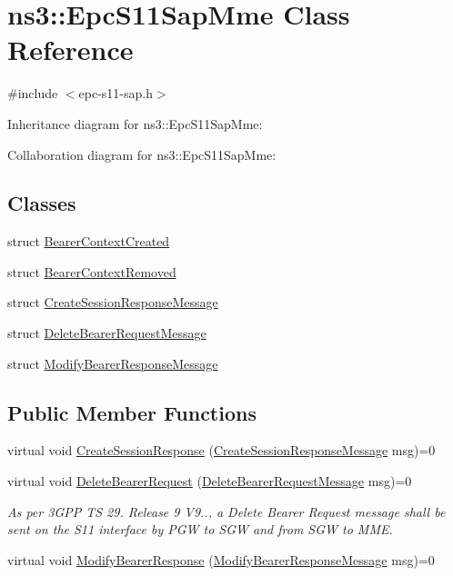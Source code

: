 \hypertarget{classns3_1_1EpcS11SapMme}{}\section{ns3\+:\+:Epc\+S11\+Sap\+Mme Class Reference}
\label{classns3_1_1EpcS11SapMme}


{\ttfamily \#include $<$epc-\/s11-\/sap.\+h$>$}



Inheritance diagram for ns3\+:\+:Epc\+S11\+Sap\+Mme\+:


Collaboration diagram for ns3\+:\+:Epc\+S11\+Sap\+Mme\+:
\subsection*{Classes}
\begin{DoxyCompactItemize}
\item 
struct \hyperlink{structns3_1_1EpcS11SapMme_1_1BearerContextCreated}{Bearer\+Context\+Created}
\item 
struct \hyperlink{structns3_1_1EpcS11SapMme_1_1BearerContextRemoved}{Bearer\+Context\+Removed}
\item 
struct \hyperlink{structns3_1_1EpcS11SapMme_1_1CreateSessionResponseMessage}{Create\+Session\+Response\+Message}
\item 
struct \hyperlink{structns3_1_1EpcS11SapMme_1_1DeleteBearerRequestMessage}{Delete\+Bearer\+Request\+Message}
\item 
struct \hyperlink{structns3_1_1EpcS11SapMme_1_1ModifyBearerResponseMessage}{Modify\+Bearer\+Response\+Message}
\end{DoxyCompactItemize}
\subsection*{Public Member Functions}
\begin{DoxyCompactItemize}
\item 
virtual void \hyperlink{classns3_1_1EpcS11SapMme_a844a9c2d1b8a5e3c5d61cb6b44d50c75}{Create\+Session\+Response} (\hyperlink{structns3_1_1EpcS11SapMme_1_1CreateSessionResponseMessage}{Create\+Session\+Response\+Message} msg)=0
\item 
virtual void \hyperlink{classns3_1_1EpcS11SapMme_a18ebb205bd46492fa9136dfc1e2ca1b2}{Delete\+Bearer\+Request} (\hyperlink{structns3_1_1EpcS11SapMme_1_1DeleteBearerRequestMessage}{Delete\+Bearer\+Request\+Message} msg)=0
\begin{DoxyCompactList}\small\item\em As per 3\+G\+PP TS 29. Release 9 V9.., a Delete Bearer Request message shall be sent on the S11 interface by P\+GW to S\+GW and from S\+GW to M\+ME. \end{DoxyCompactList}\item 
virtual void \hyperlink{classns3_1_1EpcS11SapMme_affb4585dc5d2a880f628ea043e627a66}{Modify\+Bearer\+Response} (\hyperlink{structns3_1_1EpcS11SapMme_1_1ModifyBearerResponseMessage}{Modify\+Bearer\+Response\+Message} msg)=0
\end{DoxyCompactItemize}


